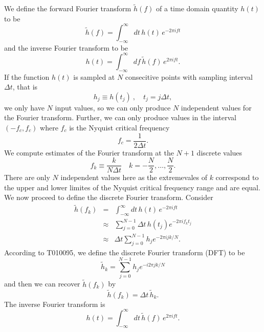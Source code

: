 We define the forward Fourier transform $\tilde{h}(f)$ of a time domain
quantity $h(t)$ to be
\begin{equation}
\tilde{h}(f)=\int_{-\infty}^\infty dt\,h(t)\, e^{- 2 \pi i f t}
\end{equation}
and the inverse Fourier transform to be 
\begin{equation}
h(t)=\int_{-\infty}^\infty df\,\tilde{h}(f)\, e^{2 \pi i f t}.
\end{equation}
If the function $h(t)$ is sampled at $N$ consecitive points with sampling
interval $\Delta t$, that is
\begin{equation}
h_j \equiv h(t_j)\ ,\quad t_j = j\Delta t,
\end{equation}
we only have $N$ input values, so we can only produce $N$ independent values
for the Fourier transform. Further, we can only produce values in the interval
$(-f_c,f_c)$ where $f_c$ is the Nyquist critical frequency
\begin{equation}
f_c = \frac{1}{2\Delta t}.
\end{equation}
We compute estimates of the Fourier transform at the $N + 1$ discrete values
\begin{equation}
f_k \equiv \frac{k}{N\Delta t}\quad k = -\frac{N}{2},\ldots,\frac{N}{2}.
\end{equation}
There are only $N$ independent values here as the extremevales of $k$
correspond to the upper and lower limites of the Nyquist critical frequency
range and are equal. We now proceed to define the discrete Fourier transform.
Consider
\begin{eqnarray}
\tilde{h}(f_k) &=& \int_{-\infty}^\infty dt\,h(t)\, e^{-2 \pi i f t} \\
&\approx& \sum_{j=0}^{N-1} \Delta t\, h(t_j) e^{-2 \pi i f_k t_j} \\
&\approx& \Delta t \sum_{j=0}^{N-1} h_j e^{-2 \pi i j k / N} .
\end{eqnarray}
According to T010095, we define the discrete Fourier transform (DFT) to be
\begin{equation}
\tilde{h}_k = \sum_{j=0}^{N-1} h_j e^{-i 2 \pi j k / N}
\end{equation}
and then we can recover $\tilde{h}(f_k)$ by
\begin{equation}
\tilde{h}(f_k) = \Delta t\, \tilde{h}_k.
\end{equation}
The inverse Fourier transform is
\begin{equation}
h(t)=\int_{-\infty}^\infty dt\,\tilde{h}(f)\, e^{2 \pi i f t} .
\end{equation}
